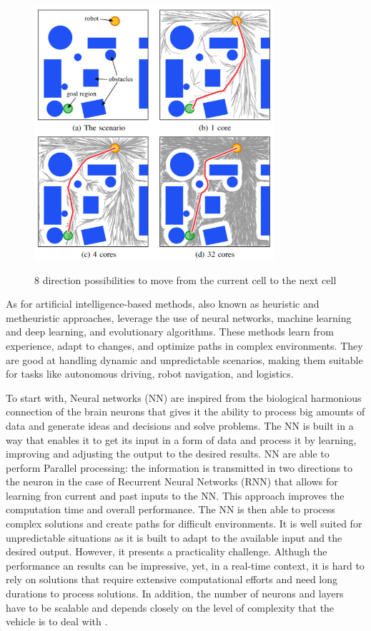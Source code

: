 \begin{figure}[H]
    \begin{center}
       \includegraphics[width=3.5in]{images/Chap1/sampling-based.png}\\
       \caption{8 direction possibilities to move from the current cell to the next cell \cite{R16}}
       \label{sampling-based}
       \end{center}
\end{figure}

As for artificial intelligence-based methods, also known as heuristic and metheuristic approaches, 
leverage the use of neural networks, machine learning and deep learning, and evolutionary algorithms. 
These methods learn from experience, adapt to changes, and optimize paths in complex environments. 
They are good at handling dynamic and unpredictable scenarios, making them suitable for tasks like 
autonomous driving, robot navigation, and logistics. 

To start with, Neural networks (NN) are inspired from the biological harmonious connection of the brain neurons
that gives it the ability to process big amounts of data and generate ideas and decisions and solve problems. 
The NN is built in a way that enables it to get its input in a form of data and process it by learning, improving 
and adjusting the output to the desired results. NN are able to perform Parallel processing: the information is 
transmitted in two
directions to the neuron in the case of Recurrent Neural Networks (RNN) that allows for learning fron current and 
past inputs to the NN. This approach improves the computation time and overall performance. 
The NN is then able to process complex solutions and create paths for difficult environments. 
It is well suited for unpredictable situations as it is built to adapt to the available input and the desired output.
However, it presents a practicality challenge. Althugh the performance an results can be impressive, yet, in a 
real-time context, 
it is hard to rely on solutions that require extensive computational efforts and need long durations to 
process solutions. In addition, the number of neurons and layers have to be scalable and depends closely on the 
level of complexity that the vehicle is to deal with \cite{R12}. 

